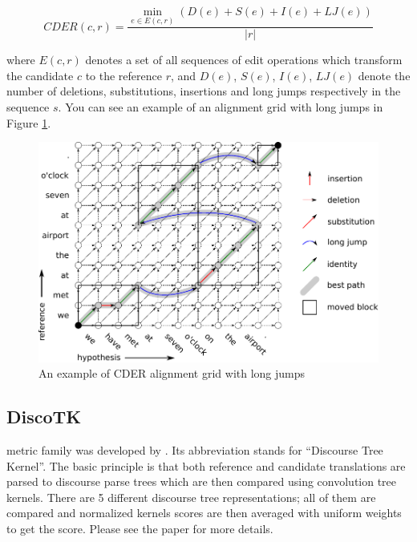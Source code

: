 \begin{equation*}
    CDER(c,r) = \frac{
        \min_{e \in E(c,r)} \left( D(e) + S(e) + I(e) + LJ(e) \right)
    }{
        |r|
    }
\end{equation*}

\noindent where $E(c,r)$ denotes a set of all sequences of edit operations
which transform the candidate $c$ to the reference $r$, and $D(e)$, $S(e)$,
$I(e)$, $LJ(e)$ denote the number of deletions, substitutions, insertions and long
jumps respectively in the sequence $s$. You can see an example of an alignment grid with
long jumps in Figure \ref{cder-grid}.

\begin{figure}
    \begin{center}
        \includegraphics[width=12cm]{img/cder-grid.pdf}
    \end{center}

    \caption{An example of CDER alignment grid with long jumps}
    \label{cder-grid}
\end{figure}

\subsection{DiscoTK}

 metric family was developed by .
Its abbreviation stands for ``Discourse Tree Kernel''. The basic principle is
that both reference and candidate translations are parsed to discourse parse
trees which are then compared using convolution tree kernels. There are 5
different discourse tree representations; all of them are compared and
normalized kernels scores are then averaged with uniform weights to get the
 score.  Please see the paper for more details.

